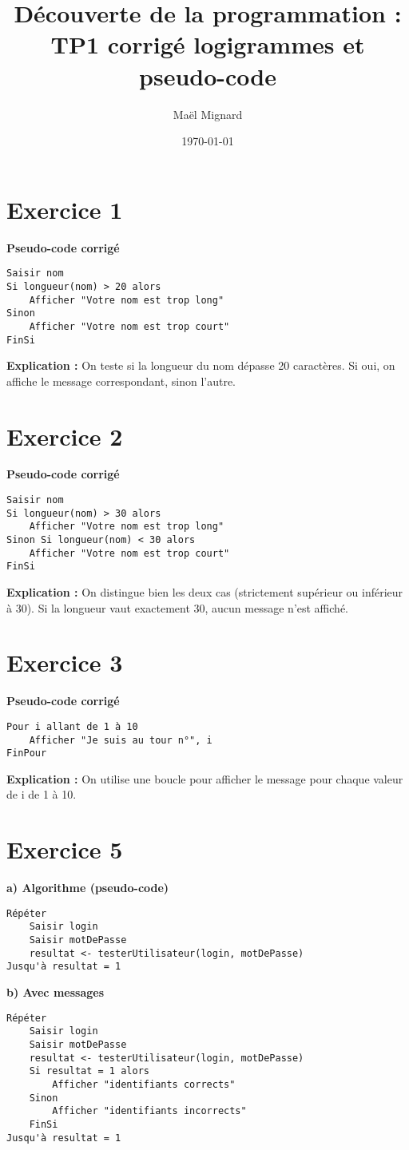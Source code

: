 \documentclass[12pt,a4paper]{article}
\title{Découverte de la programmation : TP1 corrigé logigrammes et pseudo-code}
\author{Maël Mignard}
\date{\today}
\begin{document}
\maketitle

\section*{Exercice 1}
\textbf{Pseudo-code corrigé}
\begin{verbatim}
Saisir nom
Si longueur(nom) > 20 alors
    Afficher "Votre nom est trop long"
Sinon
    Afficher "Votre nom est trop court"
FinSi
\end{verbatim}
\textbf{Explication :} On teste si la longueur du nom dépasse 20 caractères. Si oui, on affiche le message correspondant, sinon l'autre.

\section*{Exercice 2}
\textbf{Pseudo-code corrigé}
\begin{verbatim}
Saisir nom
Si longueur(nom) > 30 alors
    Afficher "Votre nom est trop long"
Sinon Si longueur(nom) < 30 alors
    Afficher "Votre nom est trop court"
FinSi
\end{verbatim}
\textbf{Explication :} On distingue bien les deux cas (strictement supérieur ou inférieur à 30). Si la longueur vaut exactement 30, aucun message n'est affiché.

\section*{Exercice 3}
\textbf{Pseudo-code corrigé}
\begin{verbatim}
Pour i allant de 1 à 10
    Afficher "Je suis au tour n°", i
FinPour
\end{verbatim}
\textbf{Explication :} On utilise une boucle pour afficher le message pour chaque valeur de i de 1 à 10.

\section*{Exercice 5}
\textbf{a) Algorithme (pseudo-code)}
\begin{verbatim}
Répéter
    Saisir login
    Saisir motDePasse
    resultat <- testerUtilisateur(login, motDePasse)
Jusqu'à resultat = 1
\end{verbatim}

\textbf{b) Avec messages}
\begin{verbatim}
Répéter
    Saisir login
    Saisir motDePasse
    resultat <- testerUtilisateur(login, motDePasse)
    Si resultat = 1 alors
        Afficher "identifiants corrects"
    Sinon
        Afficher "identifiants incorrects"
    FinSi
Jusqu'à resultat = 1
\end{verbatim}
\end{document}
